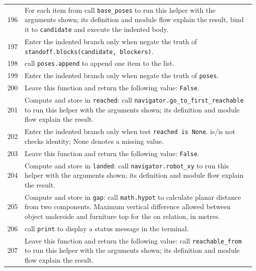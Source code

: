 \documentclass[11pt,a4paper]{book}
\begin{document}
\begin{longtable}{r p{}}
196 & For each item from call \texttt{base\_poses} to run this helper with the arguments shown; its definition and module flow explain the result, bind it to \texttt{candidate} and execute the indented body. \\

197 & Enter the indented branch only when negate the truth of \texttt{standoff.blocks(candidate, blockers)}. \\

198 & call \texttt{poses.append} to append one item to the list. \\

199 & Enter the indented branch only when negate the truth of \texttt{poses}. \\

200 & Leave this function and return the following value: \texttt{False}. \\

201 & Compute and store in \texttt{reached}: call \texttt{navigator.go\_to\_first\_reachable} to run this helper with the arguments shown; its definition and module flow explain the result.  \\

202 & Enter the indented branch only when test \texttt{reached is None}. is/is not checks identity; None denotes a missing value. \\

203 & Leave this function and return the following value: \texttt{False}. \\

204 & Compute and store in \texttt{landed}: call \texttt{navigator.robot\_xy} to run this helper with the arguments shown; its definition and module flow explain the result.  \\

205 & Compute and store in \texttt{gap}: call \texttt{math.hypot} to calculate planar distance from two components. Maximum vertical difference allowed between object underside and furniture top for the on relation, in metres. \\

206 & call \texttt{print} to display a status message in the terminal. \\

207 & Leave this function and return the following value: call \texttt{reachable\_from} to run this helper with the arguments shown; its definition and module flow explain the result. \\

\end{longtable}
\end{document}
